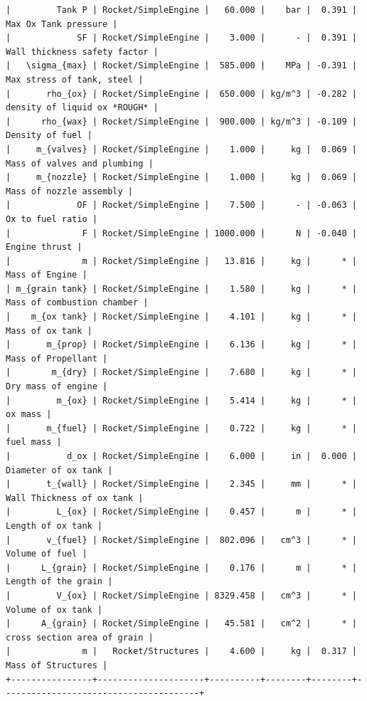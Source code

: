 \documentclass[12pt]{article}
\begin{document}
\begin{landscape}
\begin{verbatim}
|         Tank P | Rocket/SimpleEngine |   60.000 |    bar |  0.391 |                  Max Ox Tank pressure |
|             SF | Rocket/SimpleEngine |    3.000 |      - |  0.391 |          Wall thickness safety factor |
|   \sigma_{max} | Rocket/SimpleEngine |  585.000 |    MPa | -0.391 |             Max stress of tank, steel |
|       rho_{ox} | Rocket/SimpleEngine |  650.000 | kg/m^3 | -0.282 |          density of liquid ox *ROUGH* |
|      rho_{wax} | Rocket/SimpleEngine |  900.000 | kg/m^3 | -0.109 |                       Density of fuel |
|     m_{valves} | Rocket/SimpleEngine |    1.000 |     kg |  0.069 |           Mass of valves and plumbing |
|     m_{nozzle} | Rocket/SimpleEngine |    1.000 |     kg |  0.069 |               Mass of nozzle assembly |
|             OF | Rocket/SimpleEngine |    7.500 |      - | -0.063 |                      Ox to fuel ratio |
|              F | Rocket/SimpleEngine | 1000.000 |      N | -0.040 |                         Engine thrust |
|              m | Rocket/SimpleEngine |   13.816 |     kg |      * |                        Mass of Engine |
| m_{grain tank} | Rocket/SimpleEngine |    1.580 |     kg |      * |            Mass of combustion chamber |
|    m_{ox tank} | Rocket/SimpleEngine |    4.101 |     kg |      * |                       Mass of ox tank |
|       m_{prop} | Rocket/SimpleEngine |    6.136 |     kg |      * |                    Mass of Propellant |
|        m_{dry} | Rocket/SimpleEngine |    7.680 |     kg |      * |                    Dry mass of engine |
|         m_{ox} | Rocket/SimpleEngine |    5.414 |     kg |      * |                               ox mass |
|       m_{fuel} | Rocket/SimpleEngine |    0.722 |     kg |      * |                             fuel mass |
|           d_ox | Rocket/SimpleEngine |    6.000 |     in |  0.000 |                   Diameter of ox tank |
|       t_{wall} | Rocket/SimpleEngine |    2.345 |     mm |      * |             Wall Thickness of ox tank |
|         L_{ox} | Rocket/SimpleEngine |    0.457 |      m |      * |                     Length of ox tank |
|       v_{fuel} | Rocket/SimpleEngine |  802.096 |   cm^3 |      * |                        Volume of fuel |
|      L_{grain} | Rocket/SimpleEngine |    0.176 |      m |      * |                   Length of the grain |
|         V_{ox} | Rocket/SimpleEngine | 8329.458 |   cm^3 |      * |                     Volume of ox tank |
|      A_{grain} | Rocket/SimpleEngine |   45.581 |   cm^2 |      * |           cross section area of grain |
|              m |   Rocket/Structures |    4.600 |     kg |  0.317 |                    Mass of Structures |
+----------------+---------------------+----------+--------+--------+---------------------------------------+
\end{verbatim}


\end{landscape}
\end{document}
